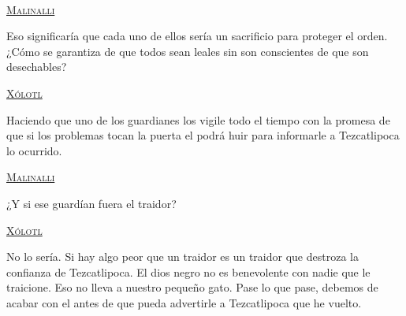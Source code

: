 \begin{center}
\\
\par
\textsc{\underline{Malinalli}}
\\
\par
Eso significaría que cada uno de ellos sería un sacrificio para proteger el orden. ¿Cómo se garantiza de que todos sean leales sin son conscientes de que son desechables?
\\
\par
\textsc{\underline{Xólotl}}
\\
\par
Haciendo que uno de los guardianes los vigile todo el tiempo con la promesa de que si los problemas tocan la puerta el podrá huir para informarle a Tezcatlipoca lo ocurrido. 
\\
\par
\textsc{\underline{Malinalli}}
\\
\par
¿Y si ese guardían fuera el traidor?
\\
\par
\textsc{\underline{Xólotl}}
\\
\par
No lo sería. Si hay algo peor que un traidor es un traidor que destroza la confianza de Tezcatlipoca. El dios negro no es benevolente con nadie que le traicione. Eso no lleva a nuestro pequeño gato. Pase lo que pase, debemos de acabar con el antes de que pueda advertirle a Tezcatlipoca que he vuelto.
\end{center}